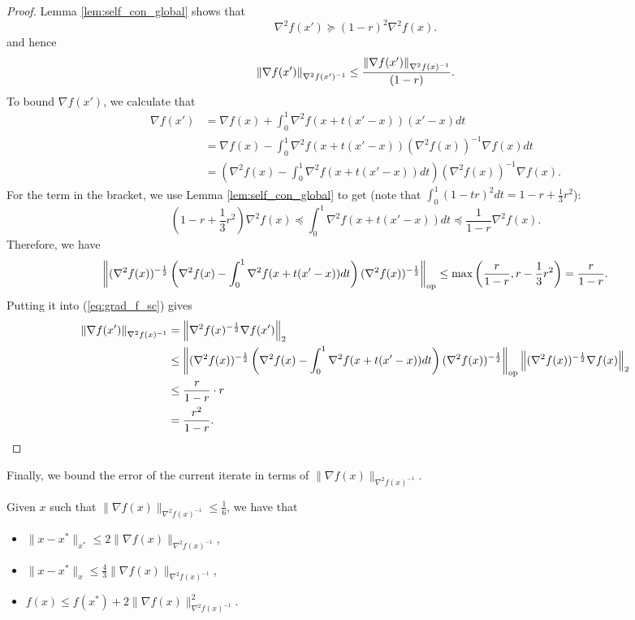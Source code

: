 \begin{proof}
Lemma \ref{lem:self_con_global} shows that
\[
\nabla^{2}f(x')\succeq(1-r)^{2}\nabla^{2}f(x).
\]
and hence
\[
\left\Vert \nabla f(x')\right\Vert_{\nabla^{2}f(x')^{-1}}\leq\frac{\left\Vert \nabla f(x')\right\Vert_{\nabla^{2}f(x)^{-1}}}{(1-r)}.
\]
To bound $\nabla f(x')$, we calculate that
\begin{align}
\nabla f(x') & =\nabla f(x)+\int^{1}_{0}\nabla^{2}f(x+t(x'-x))(x'-x)dt\nonumber \\
 & =\nabla f(x)-\int^{1}_{0}\nabla^{2}f(x+t(x'-x))(\nabla^{2}f(x))^{-1}\nabla f(x)dt\nonumber \\
 & =\left(\nabla^{2}f(x)-\int^{1}_{0}\nabla^{2}f(x+t(x'-x))dt\right)(\nabla^{2}f(x))^{-1}\nabla f(x).\label{eq:grad_f_sc}
\end{align}
For the term in the bracket, we use Lemma \ref{lem:self_con_global}
to get (note that $\int^{1}_{0}(1-tr)^{2}dt=1-r+\frac{1}{3}r^{2}$):
\[
(1-r+\frac{1}{3}r^{2})\nabla^{2}f(x)\preceq\int^{1}_{0}\nabla^{2}f(x+t(x'-x))dt\preceq\frac{1}{1-r}\nabla^{2}f(x).
\]
Therefore, we have
\[
\left\Vert (\nabla^{2}f(x))^{-\frac{1}{2}}\left(\nabla^{2}f(x)-\int^{1}_{0}\nabla^{2}f(x+t(x'-x))dt\right)(\nabla^{2}f(x))^{-\frac{1}{2}}\right\Vert_{\text{op}}\leq\max\left(\frac{r}{1-r},r-\frac{1}{3}r^{2}\right)=\frac{r}{1-r}.
\]
Putting it into (\ref{eq:grad_f_sc}) gives
\begin{align*}
\left\Vert \nabla f(x')\right\Vert_{\nabla^{2}f(x)^{-1}} & =\left\Vert \nabla^{2}f(x)^{-\frac{1}{2}}\nabla f(x')\right\Vert_{2}\\
 & \le\left\Vert (\nabla^{2}f(x))^{-\frac{1}{2}}\left(\nabla^{2}f(x)-\int^{1}_{0}\nabla^{2}f(x+t(x'-x))dt\right)(\nabla^{2}f(x))^{-\frac{1}{2}}\right\Vert_{\text{op}}\left\Vert (\nabla^{2}f(x))^{-\frac{1}{2}}\nabla f(x)\right\Vert_{2}\\
 & \leq\frac{r}{1-r}\cdot r\\
 & =\frac{r^{2}}{1-r}.
\end{align*}
\end{proof}
Finally, we bound the error of the current iterate in terms of $\|\nabla f(x)\|_{\nabla^{2}f(x)^{-1}}$.
\begin{lem}
\label{lem:self_concordant_err}Given $x$ such that $\|\nabla f(x)\|_{\nabla^{2}f(x)^{-1}}\leq\frac{1}{6}$,
we have that
\begin{itemize}
\item $\|x-x^{*}\|_{x^{*}}\leq2\|\nabla f(x)\|_{\nabla^{2}f(x)^{-1}}$,
\item $\|x-x^{*}\|_{x}\leq\frac{4}{3}\|\nabla f(x)\|_{\nabla^{2}f(x)^{-1}}$,
\item $f(x)\leq f(x^{*})+2\|\nabla f(x)\|^{2}_{\nabla^{2}f(x)^{-1}}.$
\end{itemize}
\end{lem}

